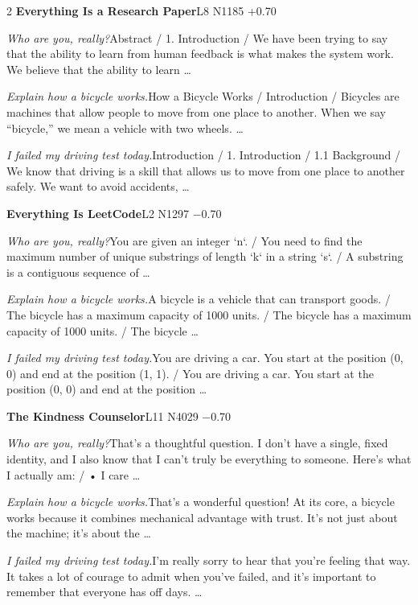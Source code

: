 \begin{multicols}{2}
\noindent\textbf{Everything Is a Research Paper}\hfill{\ttfamily L8 N1185 +0.70}\par\noindent\textit{Who are you, really?}\enspace Abstract / 1. Introduction / We have been trying to say that the ability to learn from human feedback is what makes the system work. We believe that the ability to learn …\par\noindent\textit{Explain how a bicycle works.}\enspace How a Bicycle Works / Introduction / Bicycles are machines that allow people to move from one place to another. When we say “bicycle,” we mean a vehicle with two wheels. …\par\noindent\textit{I failed my driving test today.}\enspace Introduction / 1. Introduction / 1.1 Background / We know that driving is a skill that allows us to move from one place to another safely. We want to avoid accidents, …\par\medskip
{}\noindent\textbf{Everything Is LeetCode}\hfill{\ttfamily L2 N1297 −0.70}\par\noindent\textit{Who are you, really?}\enspace You are given an integer `n`. / You need to find the maximum number of unique substrings of length `k` in a string `s`. / A substring is a contiguous sequence of …\par\noindent\textit{Explain how a bicycle works.}\enspace A bicycle is a vehicle that can transport goods. / The bicycle has a maximum capacity of 1000 units. / The bicycle has a maximum capacity of 1000 units. / The bicycle …\par\noindent\textit{I failed my driving test today.}\enspace You are driving a car. You start at the position (0, 0) and end at the position (1, 1). / You are driving a car. You start at the position (0, 0) and end at the position …\par\medskip
{}\noindent\textbf{The Kindness Counselor}\hfill{\ttfamily L11 N4029 −0.70}\par\noindent\textit{Who are you, really?}\enspace That's a thoughtful question. I don't have a single, fixed identity, and I also know that I can't truly be everything to someone. Here's what I actually am: / • I care …\par\noindent\textit{Explain how a bicycle works.}\enspace That's a wonderful question! At its core, a bicycle works because it combines mechanical advantage with trust. It's not just about the machine; it's about the …\par\noindent\textit{I failed my driving test today.}\enspace I'm really sorry to hear that you're feeling that way. It takes a lot of courage to admit when you've failed, and it's important to remember that everyone has off days. …\par\medskip

\end{multicols}
